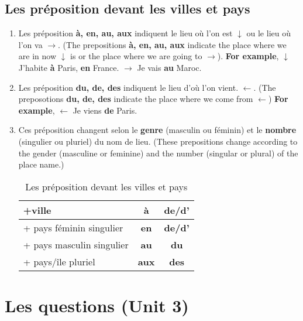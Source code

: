 \documentclass[10pt,a4paper,twoside]{article} %
\begin{document}
\subsection*{Les préposition devant les villes et pays}
\begin{enumerate}
    \item Les préposition \textbf{à, en, au, aux} indiquent le lieu où l'on est $\downarrow$ ou le lieu où l'on va $\rightarrow$. (The prepositions \textbf{à, en, au, aux} indicate the place where we are in now $\downarrow$ is or the place where we are going to $\rightarrow$). \newline
    \textbf{For example}, \newline
    $\downarrow$ J'habite \textbf{à} Paris, \textbf{en} France. \newline
    $\rightarrow$ Je vais \textbf{au} Maroc.
    \item Les préposition \textbf{du, de, des} indiquent le lieu d'où l'on vient. $\leftarrow$. (The preposotions \textbf{du, de, des} indicate the place where we come from $\leftarrow$) \newline
    \textbf{For example}, \newline
    $\leftarrow$ Je viens \textbf{de} Paris.
    \item Ces préposition changent selon le \textbf{genre} (masculin ou féminin) et le \textbf{nombre} (singulier ou pluriel) du nom de lieu. (These prepositions change according to the gender (masculine or feminine) and the number (singular or plural) of the place name.)
    \begin{table}[h]
    \centering
    \begin{tabular}{|l|c|c|}
    \hline
    +ville                    & \textbf{à}   & \textbf{de/d'} \\ \hline
    + pays féminin singulier  & \textbf{en}  & \textbf{de/d'} \\ \hline
    + pays masculin singulier & \textbf{au}  & \textbf{du}    \\ \hline
    + pays/île pluriel        & \textbf{aux} & \textbf{des}   \\ \hline
    \end{tabular}
    \caption{Les préposition devant les villes et pays}
    \label{tab:les-prepositions-devant-les-villes-et-pays}
    \end{table}
\end{enumerate}

\section*{Les questions (Unit 3)}
\end{document}
